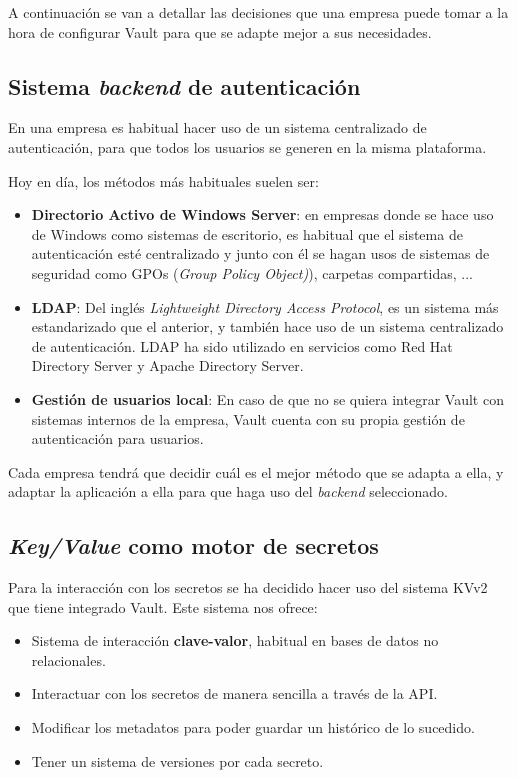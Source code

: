 \documentclass{\ClassPath/viu-tfm-template}
\begin{document}
A continuación se van a detallar las decisiones que una empresa puede tomar a la hora de configurar Vault para que se adapte mejor a sus necesidades.

\hypertarget{sistema_backend}{}
\subsection{Sistema \textit{backend} de autenticación}

En una empresa es habitual hacer uso de un sistema centralizado de autenticación, para que todos los usuarios se generen en la misma plataforma.

Hoy en día, los métodos más habituales suelen ser:
\begin{itemize}
    \item \textbf{Directorio Activo de Windows Server}: en empresas donde se hace uso de Windows como sistemas de escritorio, es habitual que el sistema de autenticación esté centralizado y junto con él se hagan usos de sistemas de seguridad como GPOs (\textit{Group Policy Object)}), carpetas compartidas, ...
    \item \textbf{LDAP}: Del inglés \textit{Lightweight Directory Access Protocol}, es un sistema más estandarizado que el anterior, y también hace uso de un sistema centralizado de autenticación. LDAP ha sido utilizado en servicios como Red Hat Directory Server y Apache Directory Server.

    \item \textbf{Gestión de usuarios local}: En caso de que no se quiera integrar Vault con sistemas internos de la empresa, Vault cuenta con su propia gestión de autenticación para usuarios.
\end{itemize}

Cada empresa tendrá que decidir cuál es el mejor método que se adapta a ella, y adaptar la aplicación a ella para que haga uso del \textit{backend} seleccionado.


\subsection{\textit{Key/Value} como motor de secretos}
Para la interacción con los secretos se ha decidido hacer uso del sistema KVv2 que tiene integrado Vault. Este sistema nos ofrece:

\begin{itemize}
    \item Sistema de interacción \textbf{clave-valor}, habitual en bases de datos no relacionales.
    \item Interactuar con los secretos de manera sencilla a través de la API.
    \item Modificar los metadatos para poder guardar un histórico de lo sucedido.
    \item Tener un sistema de versiones por cada secreto.
\end{itemize}
\end{document}
